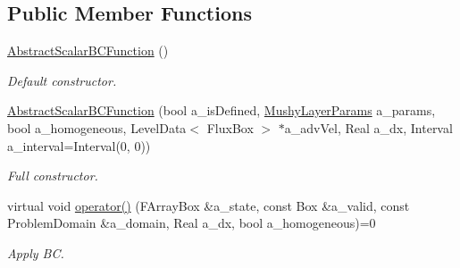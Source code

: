 \subsection*{Public Member Functions}
\begin{DoxyCompactItemize}
\item 
\hypertarget{class_abstract_scalar_b_c_function_ab17ecb34f1501f360d72fb3c2eb6d8a6}{\hyperlink{class_abstract_scalar_b_c_function_ab17ecb34f1501f360d72fb3c2eb6d8a6}{Abstract\-Scalar\-B\-C\-Function} ()}\label{class_abstract_scalar_b_c_function_ab17ecb34f1501f360d72fb3c2eb6d8a6}

\begin{DoxyCompactList}\small\item\em Default constructor. \end{DoxyCompactList}\item 
\hypertarget{class_abstract_scalar_b_c_function_ac391d3f5c821d7a7779b46388e89c221}{\hyperlink{class_abstract_scalar_b_c_function_ac391d3f5c821d7a7779b46388e89c221}{Abstract\-Scalar\-B\-C\-Function} (bool a\-\_\-is\-Defined, \hyperlink{class_mushy_layer_params}{Mushy\-Layer\-Params} a\-\_\-params, bool a\-\_\-homogeneous, Level\-Data$<$ Flux\-Box $>$ $\ast$a\-\_\-adv\-Vel, Real a\-\_\-dx, Interval a\-\_\-interval=Interval(0, 0))}\label{class_abstract_scalar_b_c_function_ac391d3f5c821d7a7779b46388e89c221}

\begin{DoxyCompactList}\small\item\em Full constructor. \end{DoxyCompactList}\item 
\hypertarget{class_abstract_scalar_b_c_function_a75298a4ff4835ee01361711eb73ea3ae}{virtual void \hyperlink{class_abstract_scalar_b_c_function_a75298a4ff4835ee01361711eb73ea3ae}{operator()} (F\-Array\-Box \&a\-\_\-state, const Box \&a\-\_\-valid, const Problem\-Domain \&a\-\_\-domain, Real a\-\_\-dx, bool a\-\_\-homogeneous)=0}\label{class_abstract_scalar_b_c_function_a75298a4ff4835ee01361711eb73ea3ae}

\begin{DoxyCompactList}\small\item\em Apply B\-C. \end{DoxyCompactList}\end{DoxyCompactItemize}
